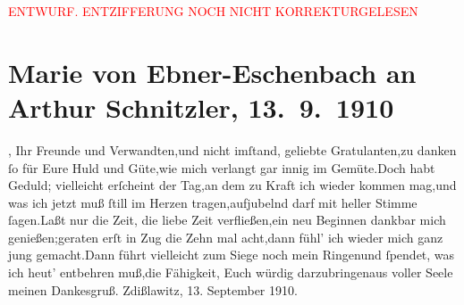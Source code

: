 
\begin{center}
            \textcolor{red}{ENTWURF. ENTZIFFERUNG NOCH NICHT KORREKTURGELESEN}
                      \end{center}
            
               \section[Marie von Ebner-Eschenbach an Arthur Schnitzler, 13. 9. 1910]{ Marie von Ebner-Eschenbach an Arthur Schnitzler,
               13. 9. 1910}\nopagebreak{}\rehead{ }\begin{ledgroupsized}[t]{13cm}\normalsize\beginnumbering{} \toendnotes[C]{\smallbreak\pagebreak[2]} 
\toendnotes[C]{\smallbreak}\stanza{}{\pb}\label{K_L02580-1v}\label{K_L02580-1h}, Ihr Freunde
                  und Verwandten,\newverse{}und nicht imſtand, geliebte Gratulanten,\newverse{}zu danken ſo für Eure Huld und Güte,\newverse{}wie mich verlangt gar innig im Gemüte.\newverse{}Doch habt Geduld; vielleicht erſcheint der Tag,\newverse{}an dem zu Kraft ich wieder kommen mag,\newverse{}und was ich jetzt muß ſtill im Herzen tragen,\newverse{}aufjubelnd darf mit heller Stimme ſagen.\newverse{}Laßt nur die Zeit, die liebe Zeit verfließen,\newverse{}ein neu Beginnen dankbar mich genießen;\newverse{}geraten erſt in Zug die Zehn mal acht,\newverse{}dann fühl’ ich wieder mich ganz jung gemacht.\newverse{}Dann führt vielleicht zum Siege noch mein Ringen\newverse{}und ſpendet, was ich heut’ entbehren muß,\newverse{}die Fähigkeit, Euch würdig darzubringen\newverse{}aus voller Seele meinen Dankesgruß.\stanzaend{}\pstart \spacefill\mbox{}\pend{}\pstart
           Zdißlawitz, 13. September
                     1910.\pend
           \endnumbering{}\end{ledgroupsized}  \newcommand{\dateiname}{L02580}\newcommand{\titel}{Marie von Ebner-Eschenbach an Arthur Schnitzler, 13. 9. 1910}\newcommand{\editorInnen}{Martin Anton Müller und Laura Untner}
      